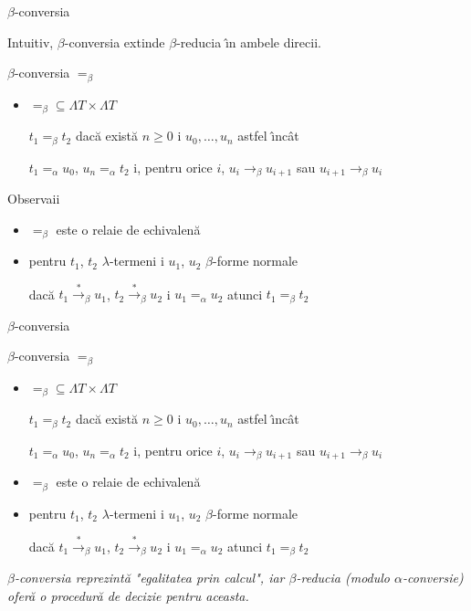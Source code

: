 \documentclass[xcolor=pdftex,romanian,colorlinks]{beamer}
\newcommand{\ra}{\rightarrow}
\newcommand{\sra}{\stackrel{*}{\rightarrow}}
\begin{document}
\begin{frame}[fragile]{$\beta$-conversia}

Intuitiv, $\beta$-conversia extinde $\beta$-reduc\ts ia \^{\i}n ambele direc\ts ii. 

\begin{block}{$\beta$-conversia  $=_\beta$}
\begin{itemize}
\item $=_\beta\subseteq \Lambda T\times \Lambda T$

$t_1=_\beta  t_2$ dac\u a  exist\u a $n\geq 0$ \sh i $u_0,\ldots, u_n$ astfel \^{\i}nc\^{a}t

$t_1=_\alpha u_0$, $u_n =_\alpha t_2$ \sh i, pentru orice $i$,
$u_i\ra_\beta u_{i+1}$ sau $u_{i+1}\ra_\beta u_{i}$

\end{itemize}
\end{block}\pause

\begin{block}{Observa\ts ii}
\begin{itemize}
\item $=_\beta$ este o rela\ts ie de echivalen\ts \u a\pause
\item pentru  $t_1$, $t_2$ $\lambda$-termeni \sh i $u_1$, $u_2$  $\beta$-forme normale 

dac\u a $t_1\sra_\beta u_1$, $t_2\sra_\beta u_2$ \sh i $u_1=_\alpha u_2$ atunci $t_1=_\beta t_2$
\end{itemize}
\end{block}

\end{frame}


\begin{frame}[fragile]{$\beta$-conversia}
\begin{block}{$\beta$-conversia  $=_\beta$}
\begin{itemize}
\item $=_\beta\subseteq \Lambda T\times \Lambda T$

$t_1=_\beta  t_2$ dac\u a  exist\u a $n\geq 0$ \sh i $u_0,\ldots, u_n$ astfel \^{\i}nc\^{a}t

$t_1=_\alpha u_0$, $u_n =_\alpha t_2$ \sh i, pentru orice $i$,
$u_i\ra_\beta u_{i+1}$ sau $u_{i+1}\ra_\beta u_{i}$

\item $=_\beta$ este o rela\ts ie de echivalen\ts \u a\pause
\item pentru  $t_1$, $t_2$ $\lambda$-termeni \sh i $u_1$, $u_2$  $\beta$-forme normale 

dac\u a $t_1\sra_\beta u_1$, $t_2\sra_\beta u_2$ \sh i $u_1=_\alpha u_2$ atunci $t_1=_\beta t_2$
\end{itemize}
\end{block}

\medskip

{\it $\beta$-conversia reprezint\u a "egalitatea prin calcul", iar $\beta$-reduc\ts ia (modulo $\alpha$-conversie) ofer\u a o procedur\u a de decizie pentru aceasta. }
\end{frame}

\begin{frame}{}
\vfill\begin{center}
\end{center}
\vfill
\end{frame}
\end{document}
